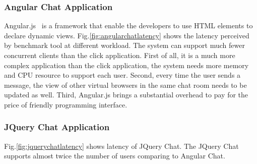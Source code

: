 






\appinstancefig{}



\subsubsection{Angular Chat Application}
\label{sec:angular}
Angular.js~\cite{angular} is a \js{} framework that enable the developers to 
use HTML elements to declare dynamic views.
Fig.\ref{fig:angularchatlatency} shows the latency perceived by benchmark tool
at different workload.
The system can support much fewer concurrent clients than the click application.
First of all, it is a much more complex application than the click application,
the system needs more memory and CPU resource to support each user.
Second, every time the user sends a message, the view of other virtual browsers
in the same chat room needs to be updated as well.
Third, Angular.js brings a substantial overhead 
to pay for the price of friendly programming interface.

\angularchatlatency{}

\subsubsection{JQuery Chat Application}
\label{sec:jquery}
Fig.\ref{fig:jquerychatlatency} shows latency of JQuery Chat.
The JQuery Chat supports almost twice the number of users comparing to Angular Chat.


\jquerychatlatency{}